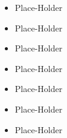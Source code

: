 \begin{itemize}
    \item Place-Holder
    \item Place-Holder
\end{itemize}
\smallskip
{}
\begin{itemize}
    \item Place-Holder
    \item Place-Holder
    \item Place-Holder
\end{itemize}

\begin{itemize}
    \item Place-Holder
    \item Place-Holder
\end{itemize}


